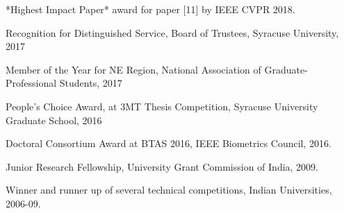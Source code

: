 

\hspace{-0.5in}*Highest Impact Paper* award for paper [11] by IEEE CVPR 2018. 

\hspace{-0.5in}Recognition for Distinguished Service, Board of Trustees, Syracuse University, 2017 

\hspace{-0.5in}Member of the Year for NE Region, National Association of Graduate-Professional Students, 2017

\hspace{-0.5in}People's Choice Award, at 3MT Thesis Competition, Syracuse University Graduate School, 2016

\hspace{-0.5in}Doctoral Consortium Award at BTAS 2016, IEEE Biometrics Council, 2016.

\hspace{-0.5in}Junior Research Fellowship, University Grant Commission of India, 2009.

\hspace{-0.5in}Winner and runner up of several technical competitions, Indian Universities, 2006-09. 